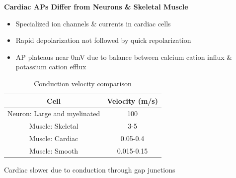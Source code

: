 \documentclass[11pt,fleqn]{book} %
\begin{document}
\textbf{Cardiac APs Differ from Neurons \&
Skeletal Muscle}
\begin{itemize}
    \item Specialized ion channels \&
currents in cardiac cells
    \item Rapid depolarization not
followed by quick
repolarization
    \item AP plateaus near 0mV due
to balance between calcium cation
influx \& potassium cation efflux
\end{itemize}
\begin{table}[]
    \centering
\begin{tabular}{cc}
\textbf{Cell}  & \textbf{Velocity (m/s)} \\
\hline
Neuron: Large and myelinated  & 100 \\
Muscle: Skeletal  & 3-5 \\
Muscle: Cardiac  & 0.05-0.4 \\
Muscle: Smooth  & 0.015-0.15 
\end{tabular}
    \caption{Conduction velocity comparison}
    \label{tab:my_label}
\end{table}

\begin{remark}
    Cardiac slower due to
conduction through
gap junctions
\end{remark}
\end{document}
